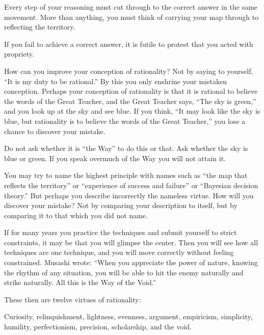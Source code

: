  Every step of your reasoning must cut through to the correct
answer in the same movement. More than anything, you must think of
carrying your map through to reflecting the territory.


 If you fail to achieve a correct answer, it is futile to protest
that you acted with propriety.


 How can you improve your conception of rationality? Not by saying
to yourself, ``It is my duty to be
rational.'' By this you only enshrine your mistaken
conception. Perhaps your conception of rationality is that it is
rational to believe the words of the Great Teacher, and the Great
Teacher says, ``The sky is green,''
and you look up at the sky and see blue. If you think,
``It may look like the sky is blue, but rationality is
to believe the words of the Great Teacher,'' you lose
a chance to discover your mistake.


 Do not ask whether it is ``the
Way'' to do this or that. Ask whether the sky is blue
or green. If you speak overmuch of the Way you will not attain it.


 You may try to name the highest principle with names such as
``the map that reflects the
territory'' or ``experience of
success and failure'' or ``Bayesian
decision theory.'' But perhaps you describe
incorrectly the nameless virtue. How will you discover your mistake?
Not by comparing your description to itself, but by comparing it to
that which you did not name.


 If for many years you practice the techniques and submit yourself
to strict constraints, it may be that you will glimpse the center. Then
you will see how all techniques are one technique, and you will move
correctly without feeling constrained. Musashi wrote:
``When you appreciate the power of nature, knowing the
rhythm of any situation, you will be able to hit the enemy naturally
and strike naturally. All this is the Way of the
Void.''


 These then are twelve virtues of rationality:


 Curiosity, relinquishment, lightness, evenness, argument,
empiricism, simplicity, humility, perfectionism, precision,
scholarship, and the void.

\myendsectiontext


\bigskip




